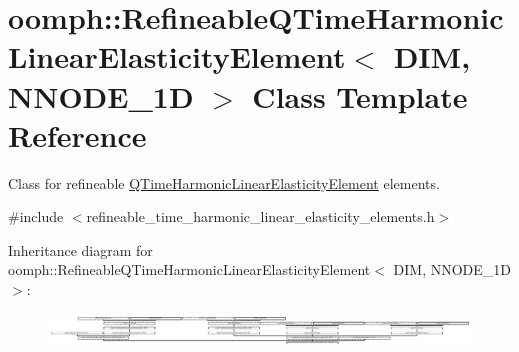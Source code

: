 \hypertarget{classoomph_1_1RefineableQTimeHarmonicLinearElasticityElement}{}\section{oomph\+:\+:Refineable\+Q\+Time\+Harmonic\+Linear\+Elasticity\+Element$<$ D\+IM, N\+N\+O\+D\+E\+\_\+1D $>$ Class Template Reference}
\label{classoomph_1_1RefineableQTimeHarmonicLinearElasticityElement}


Class for refineable \hyperlink{classoomph_1_1QTimeHarmonicLinearElasticityElement}{Q\+Time\+Harmonic\+Linear\+Elasticity\+Element} elements.  




{\ttfamily \#include $<$refineable\+\_\+time\+\_\+harmonic\+\_\+linear\+\_\+elasticity\+\_\+elements.\+h$>$}

Inheritance diagram for oomph\+:\+:Refineable\+Q\+Time\+Harmonic\+Linear\+Elasticity\+Element$<$ D\+IM, N\+N\+O\+D\+E\+\_\+1D $>$\+:\begin{figure}[H]
\begin{center}
\leavevmode
\includegraphics[height=0.899358cm]{classoomph_1_1RefineableQTimeHarmonicLinearElasticityElement}
\end{center}
\end{figure}
